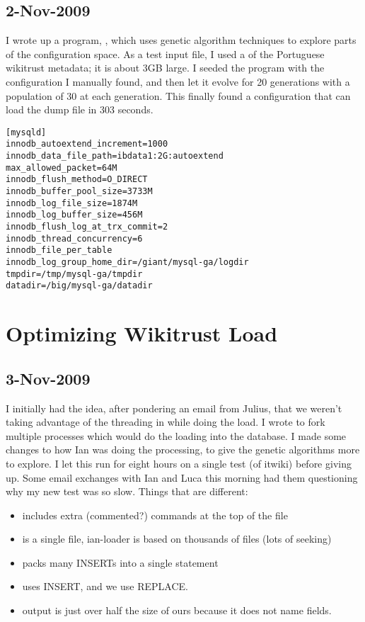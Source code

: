 \subsection{2-Nov-2009}

I wrote up a program, , which uses genetic algorithm
techniques to explore parts of the configuration space.
As a test input file, I used a  of the Portuguese wikitrust
metadata; it is about 3GB large.
I seeded the program with the configuration I manually found,
and then let it evolve for 20 generations with a population of 30
at each generation.
This finally found a configuration that can load the dump file
in 303 seconds.

\begin{verbatim}
[mysqld]
innodb_autoextend_increment=1000
innodb_data_file_path=ibdata1:2G:autoextend
max_allowed_packet=64M
innodb_flush_method=O_DIRECT
innodb_buffer_pool_size=3733M
innodb_log_file_size=1874M
innodb_log_buffer_size=456M
innodb_flush_log_at_trx_commit=2
innodb_thread_concurrency=6
innodb_file_per_table
innodb_log_group_home_dir=/giant/mysql-ga/logdir
tmpdir=/tmp/mysql-ga/tmpdir
datadir=/big/mysql-ga/datadir
\end{verbatim}

\section{Optimizing Wikitrust Load}

\subsection{3-Nov-2009}

I initially had the idea, after pondering an email from Julius, that we weren't
taking advantage of the threading in \mysql while doing the load.
I wrote  to fork multiple processes which would
do the loading into the database.
I made some changes to how Ian was doing the processing, to give
the genetic algorithms more to explore.
I let this run for eight hours on a single test (of itwiki) before giving up.
Some email exchanges with Ian and Luca this morning had them
questioning why my new test was so slow.
Things that are different:
\begin{itemize}
\item {} includes extra (commented?) commands at the top of the file
\item {} is a single file, ian-loader is based on thousands of files (lots of seeking)
\item {} packs many INSERTs into a single statement
\item {} uses INSERT, and we use REPLACE.
\item {} output is just over half the size of ours because it does not name fields.
\end{itemize}

